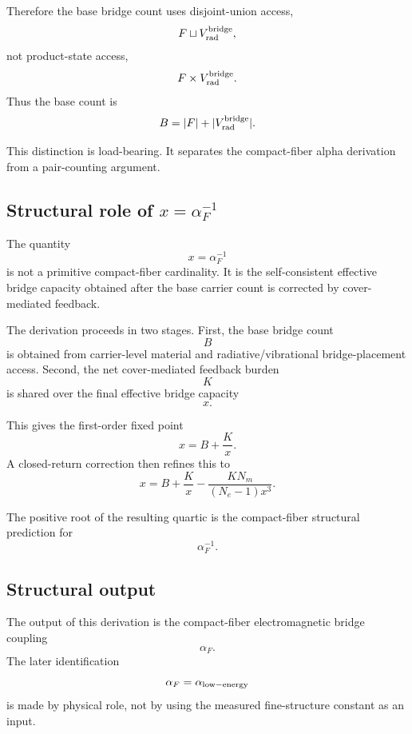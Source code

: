 Therefore the base bridge count uses disjoint-union access,
\[
F\sqcup V_{\rm rad}^{\rm bridge},
\]
not product-state access,
\[
F\times V_{\rm rad}^{\rm bridge}.
\]
Thus the base count is
\[
B=|F|+|V_{\rm rad}^{\rm bridge}|.
\]

This distinction is load-bearing. It separates the compact-fiber alpha derivation from a pair-counting argument.

\subsection{\texorpdfstring{Structural role of \(x=\alpha_F^{-1}\)}{Structural role of x = alphaF inverse}}

The quantity
\[
x=\alpha_F^{-1}
\]
is not a primitive compact-fiber cardinality. It is the self-consistent effective bridge capacity obtained after the base carrier count is corrected by cover-mediated feedback.

The derivation proceeds in two stages. First, the base bridge count
\[
B
\]
is obtained from carrier-level material and radiative/vibrational bridge-placement access. Second, the net cover-mediated feedback burden
\[
K
\]
is shared over the final effective bridge capacity
\[
x.
\]

This gives the first-order fixed point
\[
x=B+\frac{K}{x}.
\]
A closed-return correction then refines this to
\[
x
=
B+\frac{K}{x}
-
\frac{K N_m}{(N_e-1)x^3}.
\]

The positive root of the resulting quartic is the compact-fiber structural prediction for
\[
\alpha_F^{-1}.
\]

\subsection{Structural output}

The output of this derivation is the compact-fiber electromagnetic bridge coupling
\[
\alpha_F.
\]
The later identification
\[
\alpha_F=\alpha_{\rm low-energy}
\]
is made by physical role, not by using the measured fine-structure constant as an input.